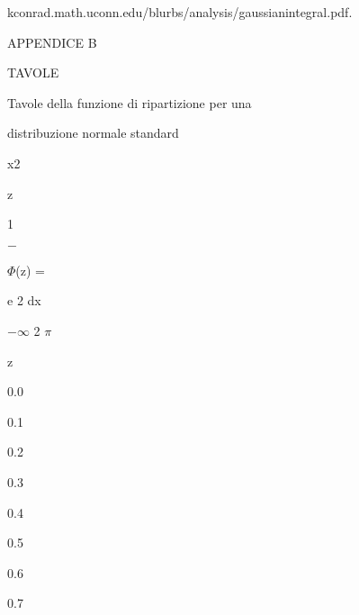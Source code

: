 \documentclass[a4paper,portrait,12pt]{article}
\begin{document}
\begin{flushleft}
kconrad.math.uconn.edu/blurbs/analysis/gaussianintegral.pdf.
\end{flushleft}





\begin{flushleft}
\newpage
\newpage
APPENDICE B
\end{flushleft}


\begin{flushleft}
TAVOLE
\end{flushleft}





\begin{flushleft}
Tavole della funzione di ripartizione per una
\end{flushleft}


\begin{flushleft}
distribuzione normale standard
\end{flushleft}


\begin{flushleft}
x2
\end{flushleft}


\begin{flushleft}
z
\end{flushleft}


1


$-$


\begin{flushleft}
$\Phi$(z) =
\end{flushleft}


\begin{flushleft}
e 2 dx
\end{flushleft}


\begin{flushleft}
$-$$\infty$ 2 $\pi$
\end{flushleft}





\begin{flushleft}
z
\end{flushleft}


0.0


0.1


0.2


0.3


0.4


0.5


0.6


0.7
\end{document}
